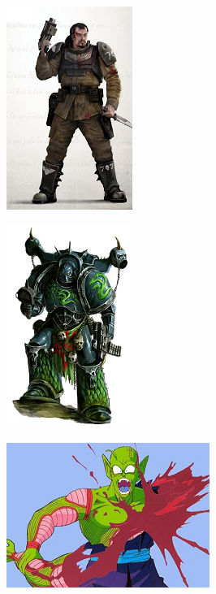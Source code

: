 \begin{figure}
	\begin{center}
		\includegraphics[width=\figwidth]{pics/6/45.png}
	\end{center}
\end{figure}

\begin{figure}
	\begin{center}
		\includegraphics[width=\figwidth]{pics/6/46.png}
	\end{center}
\end{figure}

\begin{figure}
	\begin{center}
		\includegraphics[width=\figwidth]{pics/6/47.png}
	\end{center}
\end{figure}

